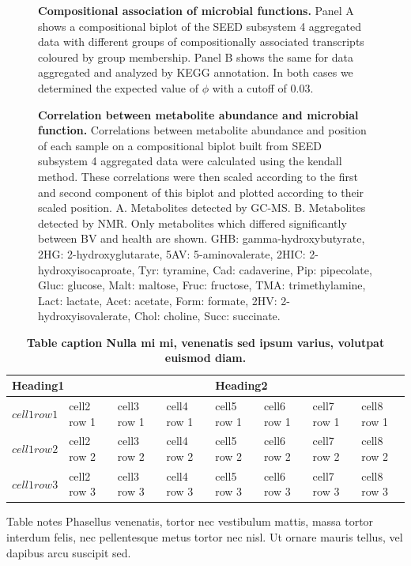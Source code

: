 \documentclass[10pt,letterpaper]{article}
\begin{document}
\begin{figure}[h]
\caption{{\bf Compositional association of microbial functions.}
Panel A shows a compositional biplot of the SEED subsystem 4 aggregated data with different groups of compositionally associated transcripts coloured by group membership. Panel B shows the same for data aggregated and analyzed by KEGG annotation. In both cases we determined the expected value of $\phi$ with a cutoff of 0.03. }
\label{F3:phi_biplot}
\end{figure}


\begin{figure}[h]
\caption{{\bf Correlation between metabolite abundance and microbial function.}
 Correlations between metabolite abundance and position of each sample on a compositional biplot built from SEED subsystem 4 aggregated data were calculated using the kendall method. These correlations were then scaled according to the first and second component of this biplot and plotted according to their scaled position. A. Metabolites detected by GC-MS. B. Metabolites detected by NMR. Only metabolites which differed significantly between BV and health are shown. GHB: gamma-hydroxybutyrate, 2HG: 2-hydroxyglutarate, 5AV: 5-aminovalerate, 2HIC: 2-hydroxyisocaproate, Tyr: tyramine, Cad: cadaverine, Pip: pipecolate, Gluc: glucose, Malt: maltose, Fruc: fructose, TMA: trimethylamine, Lact: lactate, Acet: acetate, Form: formate, 2HV: 2-hydroxyisovalerate, Chol: choline, Succ: succinate.}
\label{F5:metabolite_biplot}
\end{figure}


\begin{table}[!ht]
\begin{adjustwidth}{-2.25in}{0in} %
\caption{
{\bf Table caption Nulla mi mi, venenatis sed ipsum varius, volutpat euismod diam.}}
\begin{tabular}{|l|l|l|l|l|l|l|l|}
\hline
\multicolumn{4}{|l|}{\bf Heading1} & \multicolumn{4}{|l|}{\bf Heading2}\\ \hline
$cell1 row1$ & cell2 row 1 & cell3 row 1 & cell4 row 1 & cell5 row 1 & cell6 row 1 & cell7 row 1 & cell8 row 1\\ \hline
$cell1 row2$ & cell2 row 2 & cell3 row 2 & cell4 row 2 & cell5 row 2 & cell6 row 2 & cell7 row 2 & cell8 row 2\\ \hline
$cell1 row3$ & cell2 row 3 & cell3 row 3 & cell4 row 3 & cell5 row 3 & cell6 row 3 & cell7 row 3 & cell8 row 3\\ \hline
\end{tabular}
\begin{flushleft} Table notes Phasellus venenatis, tortor nec vestibulum mattis, massa tortor interdum felis, nec pellentesque metus tortor nec nisl. Ut ornare mauris tellus, vel dapibus arcu suscipit sed.
\end{flushleft}
\label{table1}
\end{adjustwidth}
\end{table}
\end{document}
